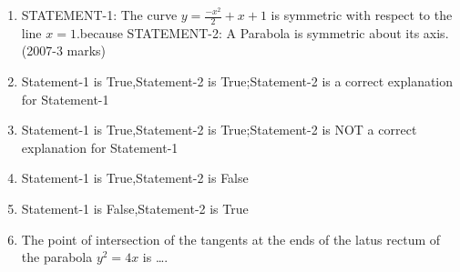 	\begin{enumerate}

\item STATEMENT-1: The curve $y=\frac{-x^2}{2}+x+1$ is symmetric with respect to the line $x=1$.because
STATEMENT-2: A Parabola is symmetric about its axis.
\hfill(2007-3 marks)
    \item Statement-1 is True,Statement-2 is True;Statement-2 is a correct explanation for Statement-1\item  Statement-1 is True,Statement-2 is True;Statement-2 is NOT a correct explanation for Statement-1\item Statement-1 is True,Statement-2 is False\item Statement-1 is False,Statement-2 is True
     \item The point of intersection of the tangents at the ends of the latus rectum of the parabola $y^2=4x$ is \ldots.
    \hfill{}
    

\end{enumerate}

